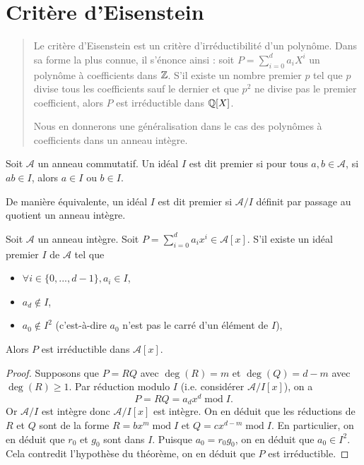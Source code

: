 \documentclass[../main.tex]{subfiles}
\begin{document}
\section{Critère d'Eisenstein}
\begin{abstract}
    Le critère d'Eisenstein est un critère d'irréductibilité d'un polynôme. Dans sa forme
     la plus connue, il s'énonce ainsi : soit \(P = \sum_{i=0}^d a_i X^i\) un polynôme à coefficients dans \(\mathbb{Z}\).
     S'il existe un nombre premier \(p\) tel que \(p\) divise tous les coefficients sauf le dernier et que 
     \(p^2\) ne divise pas le premier coefficient, alors \(P\) est irréductible dans \(\mathbb{Q}[X]\).

     Nous en donnerons une généralisation dans le cas des polynômes à coefficients dans un anneau intègre.
\end{abstract}
\begin{definition} Soit \(\mathcal{A}\) un anneau commutatif. Un idéal \(I\) est dit premier
    si pour tous \(a,b\in \mathcal{A}\), si \(ab\in I\), alors \(a\in I\) ou \(b\in I\).
    \begin{remark} De manière équivalente, un idéal \(I\) est dit premier si \(\mathcal{A}/I\) définit par
        passage au quotient un anneau intègre.
    \end{remark}
\end{definition}
\begin{theorem} Soit \(\mathcal{A}\) un anneau intègre. Soit \(P = \sum_{i=0}^d a_ix^i\in \mathcal{A}[x]\).
    S'il existe un idéal premier \(I\) de \(\mathcal{A}\) tel que 
    \begin{itemize}
        \item \(\forall i\in \{0,...,d-1\}, a_i\in I\),
        \item \(a_d\notin I\),
        \item \(a_0\notin I^2\) (c'est-à-dire \(a_0\) n'est pas le carré d'un élément de \(I\)),
    \end{itemize}
    Alors \(P\) est irréductible dans \(\mathcal{A}[x]\).
\end{theorem}
\begin{proof} Supposons que \(P = RQ\) avec \(\deg(R) = m\) et \(\deg(Q) = d-m\) avec \(\deg(R) \ge 1\).
    Par réduction modulo \(I\) (i.e. considérer \(\mathcal{A}/I[x]\)), on a 
    \begin{equation}
        P = RQ = a_d x^d\; \mathrm{mod}\;I.
    \end{equation}
    Or \(\mathcal{A}/I\) est intègre donc \(\mathcal{A}/I[x]\) est intègre. On en déduit que les réductions de \(R\) et \(Q\)
    sont de la forme \(R = bx^{m} \; \mathrm{mod}\;I\) et \(Q = cx^{d-m}\; \mathrm{mod}\;I\). En particulier, on en déduit que
    \(r_0\) et \(g_0\) sont dans \(I\). Puisque \(a_0 = r_0g_0\), on en déduit que \(a_0\in I^2\). Cela contredit l'hypothèse du théorème,
    on en déduit que \(P\) est irréductible.
\end{proof}
\end{document}
